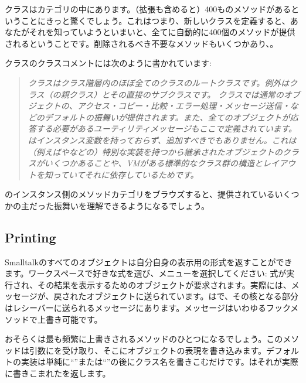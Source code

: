 \documentclass[a4paper,10pt,twoside]{book}
\begin{document}
クラスはカテゴリの中にあります。（拡張も含めると）400ものメソッドがあるということにきっと驚くでしょう。これはつまり、新しいクラスを定義すると、あなたがそれを知っていようといまいと、全てに自動的に400個のメソッドが提供されるということです。削除されるべき不要なメソッドもいくつかあり、。

クラスのクラスコメントには次のように書かれています:

\begin{quote}
\textit{クラスはクラス階層内のほぼ全てのクラスのルートクラスです。例外はクラス（の親クラス）とその直接のサブクラスです。
クラスでは通常のオブジェクトの、アクセス・コピー・比較・エラー処理・メッセージ送信・などのデフォルトの振舞いが提供されます。また、全てのオブジェクトが応答する必要があるユーティリティメッセージもここで定義されています。
はインスタンス変数を持っておらず、追加すべきでもありません。これは（例えばやなどの）特別な実装を持つから継承されたオブジェクトのクラスがいくつかあることや、VMがある標準的なクラス群の構造とレイアウトを知っていてそれに依存しているためです。
}
\end{quote}

のインスタンス側のメソッドカテゴリをブラウズすると、提供されているいくつかの主だった振舞いを理解できるようになるでしょう。

\subsection{Printing}
Smalltalkのすべてのオブジェクトは自分自身の表示用の形式を返すことができます。ワークスペースで好きな式を選び、メニューを選択してください: 式が実行され、その結果を表示するためのオブジェクトが要求されます。実際には、メッセージが、戻されたオブジェクトに送られています。はで、その核となる部分はレシーバーに送られるメッセージにあります。メッセージはいわゆるフックメソッドで上書き可能です。

おそらくは最も頻繁に上書きされるメソッドのひとつになるでしょう。このメソッドは引数にを受け取り、そこにオブジェクトの表現を書き込みます。デフォルトの実装は単純に``''または``''の後にクラス名を書きこむだけです。はそれが実際に書きこまれたを返します。
\end{document}
